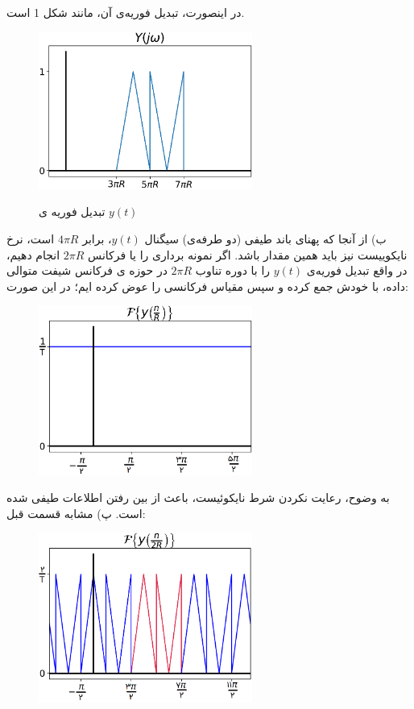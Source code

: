 \documentclass[10pt,letterpaper]{article}
\newcommand{\nl}{\newline\newline}
\begin{document}
در اینصورت، تبدیل فوریه‌ی آن، مانند شکل 1 است.
\begin{figure}[h!]
\centering
\includegraphics[width=70mm]{PSol8_Q2_1}
\label{fig1}
\caption{تبدیل فوریه ی $y(t)$}
\end{figure}
\nl
ب) از آنجا که پهنای باند طیفی (دو طرفه‌ی) سیگنال $y(t)$، برابر $4\pi R$ است، نرخ نایکوییست نیز باید همین مقدار باشد. اگر نمونه برداری را یا فرکانس $2\pi R$ انجام دهیم، در واقع تبدیل فوریه‌ی $y(t)$ را با دوره تناوب $2\pi R$ در حوزه ی فرکانس شیفت متوالی داده، با خودش جمع کرده و سپس مقیاس فرکانسی را عوض کرده ایم؛ در این صورت:
\begin{figure}[h!]
\centering
\includegraphics[width=70mm]{PSol8_Q2_2}
\end{figure}
به وضوح، رعایت نکردن شرط نایکوئیست، باعث از بین رفتن اطلاعات طیفی شده است.
\nl
پ) مشابه قسمت قبل:
\begin{figure}[h!]
\centering
\includegraphics[width=70mm]{PSol8_Q2_3}
\end{figure}
\end{document}
